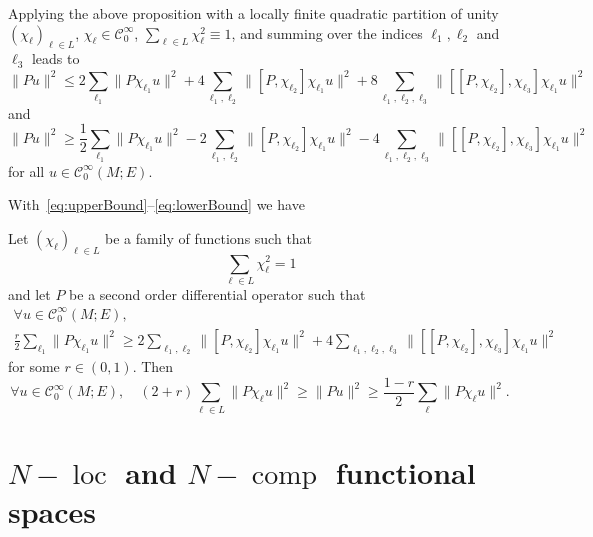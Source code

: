 \documentclass[AHL,Unicode,longabstracts]{cedram}
\newcommand{\clC}{\mathcal{C}}
\DeclareMathOperator{\ccomp}{comp}
\DeclareMathOperator{\locc}{loc}
\let\oldforall\forall
\renewcommand*{\forall}{\mathrel{\oldforall}}
\begin{document}
Applying the above proposition with a locally finite quadratic partition of unity $(\chi_{\ell})_{\ell\in L}$, $\chi_{\ell}\in \clC^{\infty}_{0}$, $\sum_{\ell\in L}\chi_{\ell}^{2}\equiv 1$, and summing over the indices $\ell_{1},\ell_{2}$ and $\ell_{3}$ leads to
\begin{equation}\label{eq:upperBound}
\|Pu\|^{2} \leq 2 \sum_{\ell_{1}}\|P\chi_{\ell_{1}} u \|^{2} + 4 \sum_{\ell_{1},\ell_{2}} \|[P,\chi_{\ell_{2}}]\chi_{\ell_{1}}u\|^{2} + 8 \sum_{\ell_{1},\ell_{2},\ell_{3}}\|[[P,\chi_{\ell_{2}}],\chi_{\ell_{3}}]\chi_{\ell_{1}}u \|^{2}
\end{equation}
and
\begin{equation}\label{eq:lowerBound}
\|Pu\|^{2} \geq \frac{1}{2} \sum_{\ell_{1}}\|P\chi_{\ell_{1}} u \|^{2} -2 \sum_{\ell_{1},\ell_{2}} \|[P,\chi_{\ell_{2}}]\chi_{\ell_{1}}u\|^{2} -4 \sum_{\ell_{1},\ell_{2},\ell_{3}}\|[[P,\chi_{\ell_{2}}],\chi_{\ell_{3}}]\chi_{\ell_{1}}u \|^{2}
\end{equation}
for all $u\in \clC^{\infty}_{0}(M;E)$.

With~\eqref{eq:upperBound}--\eqref{eq:lowerBound} we have

\begin{coro}\label{Cor:equivalenceOfQuantities}
Let $(\chi_{\ell})_{\ell\in L}$ be a family of functions such that
\[
\sum_{\ell\in L} \chi_{\ell}^{2} = 1
\]
and let $P$ be a second order differential operator such that
\begin{multline}\label{eq:equivH}
\forall u \in \clC^{\infty}_{0}(M;E), \\
\frac{r}{2}\sum_{\ell_{1}}\|P\chi_{\ell_{1}} u \|^{2}
\geq 2 \sum_{\ell_{1},\ell_{2}} \|[P,\chi_{\ell_{2}}]\chi_{\ell_{1}}u\|^{2} 
+4 \sum_{\ell_{1},\ell_{2},\ell_{3}}\|[[P,\chi_{\ell_{2}}],\chi_{\ell_{3}}]\chi_{\ell_{1}}u \|^{2}
\end{multline}
for some $r\in (0,1)$. Then
\begin{equation}\label{eq:equiv1}
\forall u\in \clC^{\infty}_{0}(M;E),\quad (2+r) \sum_{\ell\in L}\|P\chi_{\ell}u\|^{2}\geq \|Pu\|^{2}\geq \frac{1-r}{2} \sum_{\ell}\|P\chi_{\ell}u\|^{2}.
\end{equation}
\end{coro}


\section{\texorpdfstring{$N-\locc$}{N-loc} and \texorpdfstring{$N-\ccomp$}{N-comp} functional spaces}\label{sec:Qloccomp}
\end{document}
